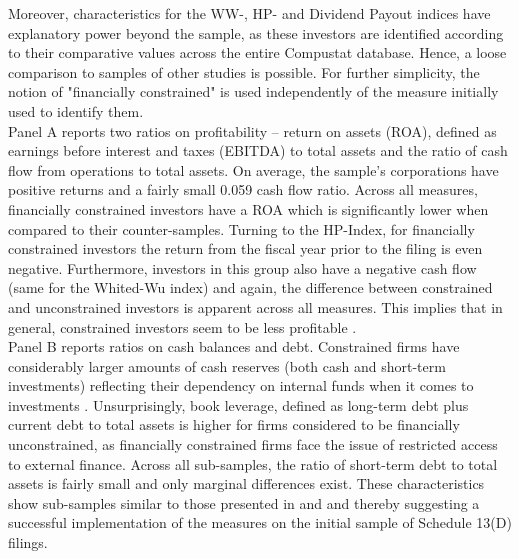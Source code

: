 \documentclass[12pt]{article}
\begin{document}
\pagebreak
\noindent Moreover, characteristics for the WW-, HP- and Dividend Payout indices have explanatory power beyond the sample, as these investors are identified according to their comparative values across the entire Compustat database. 
%
Hence, a loose comparison to samples of other studies is possible. For further simplicity, the notion of "financially constrained" is used independently of the measure initially used to identify them. \\
Panel A reports two ratios on profitability -- return on assets (ROA), defined as earnings before interest and taxes (EBITDA) to total assets and the ratio of cash flow from operations to total assets. On average, the sample's corporations have positive returns and a fairly small 0.059 cash flow ratio. Across all measures, financially constrained investors have a ROA which is significantly lower when compared to their counter-samples. Turning to the HP-Index, for financially constrained investors the return from the fiscal year prior to the filing is even negative. Furthermore, investors in this group also have a negative cash flow (same for the Whited-Wu index) and again, the difference between constrained and unconstrained investors is apparent across all measures. This implies that in general, constrained investors seem to be less profitable \citet[p.544]{Whited2006}. \\
Panel B reports ratios on cash balances and debt. Constrained firms have considerably larger amounts of cash reserves (both cash and short-term investments) reflecting their dependency on internal funds when it comes to investments \citep[p.142]{Fazzari1988}. Unsurprisingly, book leverage, defined as long-term debt plus current debt to total assets \citep[p.1440]{MacKay2005} is higher for firms considered to be financially unconstrained, as financially constrained firms face the issue of restricted access to external finance. Across all sub-samples, the ratio of short-term debt to total assets is fairly small and only marginal differences exist. These characteristics show sub-samples similar to those presented in \citet[p.544]{Whited2006} and \citet[p.1917]{hadlock2010} and thereby suggesting a successful implementation of the measures on the initial sample of Schedule 13(D) filings.
\end{document}
